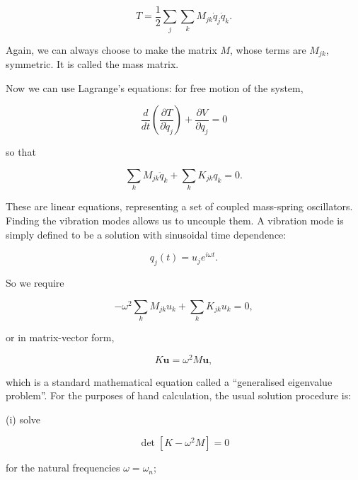   \begin{equation*}T=\dfrac{1}{2}\sum_j \sum_k M_{jk} \dot{q}_j \dot{q}_k . 
  \tag{2}\end{equation*} 

  Again, we can always choose to make the matrix $M$, whose terms are $M_{jk}$, 
  symmetric. It is called the mass matrix. 

  Now we can use Lagrange's equations: for free motion of the system, 

  \begin{equation*}\dfrac{d}{dt}\left( \dfrac{\partial T}{\partial 
  \dot{q}_j}\right)+\dfrac{\partial V}{\partial q_j}=0 \tag{3}\end{equation*} 

  \noindent{}so that 

  \begin{equation*}\sum_k M_{jk} \ddot{q}_k + \sum_k K_{jk} q_k =0. 
  \tag{4}\end{equation*} 

  These are linear equations, representing a set of coupled mass-spring 
  oscillators. Finding the vibration modes allows us to uncouple them. A 
  vibration mode is simply defined to be a solution with sinusoidal time 
  dependence: 

  \begin{equation*}q_j(t)=u_j e^{i\omega t}. \tag{5}\end{equation*} 

  So we require 

  \begin{equation*}-\omega^2 \sum_k M_{jk} u_k + \sum_k K_{jk} u_k =0, 
  \tag{6}\end{equation*} 

  \noindent{}or in matrix-vector form, 

  \begin{equation*}K \mathbf{u}=\omega^2 M \mathbf{u}, \tag{7}\end{equation*} 

  \noindent{}which is a standard mathematical equation called a ``generalised 
  eigenvalue problem''. For the purposes of hand calculation, the usual 
  solution procedure is: 

  (i) solve 

  \begin{equation*}\det[K -\omega^2 M ]=0 \tag{8}\end{equation*} 

  \noindent{}for the natural frequencies $\omega=\omega_n$; 

